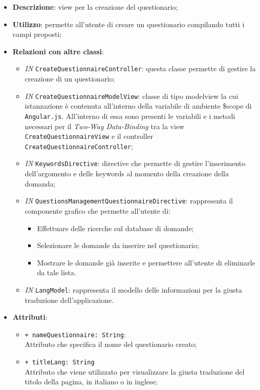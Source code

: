 \begin{itemize}
	\item \textbf{Descrizione}: view per la creazione del questionario;
	\item \textbf{Utilizzo}: permette all'utente di creare un questionario compilando tutti i campi proposti;
	\item \textbf{Relazioni con altre classi}:
	\begin{itemize}
		\item \textit{IN} \texttt{CreateQuestionnaireController}:  questa classe permette di gestire la creazione di un questionario;
		\item \textit{IN} \texttt{CreateQuestionnaireModelView}: classe di tipo modelview la cui istanzazione è contenuta all'interno della variabile di ambiente \$scope di \texttt{Angular.js}. All'interno di essa sono presenti le variabili e i metodi necessari per il \textit{Two-Way Data-Binding} tra la view \texttt{CreateQuestionnaireView} e il controller \texttt{CreateQuestionnaireController};
		\item \textit{IN} \texttt{KeywordsDirective}: directive che permette di gestire l'inserimento dell'argomento e delle keywords al momento della creazione della domanda;
		\item \textit{IN} \texttt{QuestionsManagementQuestionnaireDirective}: rappresenta il componente grafico che permette all'utente di:
		\begin{itemize}
			\item Effettuare delle ricerche sul database di domande;
			\item Selezionare le domande da inserire nel questionario;
			\item Mostrare le domande già inserite e permettere all'utente di eliminarle da tale lista.
		\end{itemize}
		\item \textit{IN} \texttt{LangModel}: rappresenta il modello delle informazioni per la giusta traduzione dell'applicazione.
	\end{itemize}
		\item \textbf{Attributi}:
		\begin{itemize}
			\item \texttt{+ nameQuestionnaire: String}: \\ Attributo che specifica il nome del questionario creato;
			\item \texttt{+ titleLang: String} \\ Attributo che viene utilizzato per visualizzare la giusta traduzione del titolo della pagina, in italiano o in inglese;

\end{itemize}
\end{itemize}
